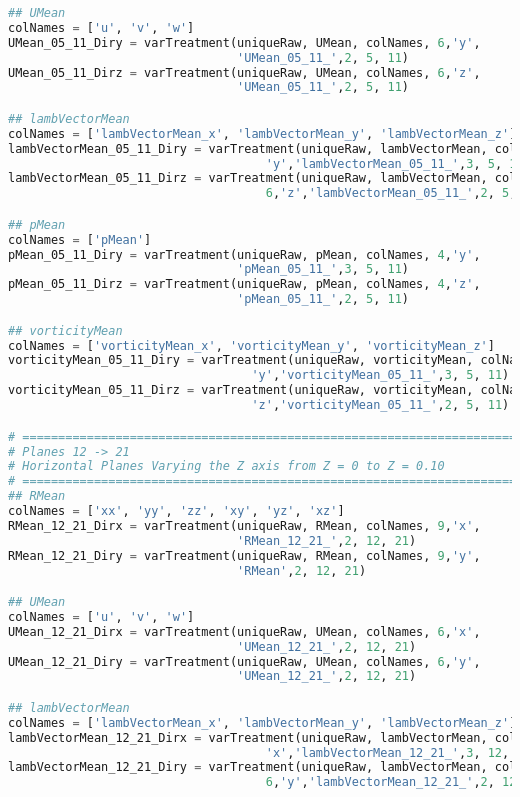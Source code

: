 \documentclass[../main.tex]{subfiles}
\begin{document}
\begin{lstlisting}[language=python]
## UMean
colNames = ['u', 'v', 'w']
UMean_05_11_Diry = varTreatment(uniqueRaw, UMean, colNames, 6,'y',
                                'UMean_05_11_',2, 5, 11)
UMean_05_11_Dirz = varTreatment(uniqueRaw, UMean, colNames, 6,'z',
                                'UMean_05_11_',2, 5, 11)

## lambVectorMean
colNames = ['lambVectorMean_x', 'lambVectorMean_y', 'lambVectorMean_z']
lambVectorMean_05_11_Diry = varTreatment(uniqueRaw, lambVectorMean, colNames, 6,
                                    'y','lambVectorMean_05_11_',3, 5, 11)
lambVectorMean_05_11_Dirz = varTreatment(uniqueRaw, lambVectorMean, colNames,
                                    6,'z','lambVectorMean_05_11_',2, 5, 11)

## pMean
colNames = ['pMean']
pMean_05_11_Diry = varTreatment(uniqueRaw, pMean, colNames, 4,'y',
                                'pMean_05_11_',3, 5, 11)
pMean_05_11_Dirz = varTreatment(uniqueRaw, pMean, colNames, 4,'z',
                                'pMean_05_11_',2, 5, 11)

## vorticityMean
colNames = ['vorticityMean_x', 'vorticityMean_y', 'vorticityMean_z']
vorticityMean_05_11_Diry = varTreatment(uniqueRaw, vorticityMean, colNames, 6,
                                  'y','vorticityMean_05_11_',3, 5, 11)
vorticityMean_05_11_Dirz = varTreatment(uniqueRaw, vorticityMean, colNames, 6,
                                  'z','vorticityMean_05_11_',2, 5, 11)

# =============================================================================
# Planes 12 -> 21
# Horizontal Planes Varying the Z axis from Z = 0 to Z = 0.10
# =============================================================================
## RMean
colNames = ['xx', 'yy', 'zz', 'xy', 'yz', 'xz']
RMean_12_21_Dirx = varTreatment(uniqueRaw, RMean, colNames, 9,'x',
                                'RMean_12_21_',2, 12, 21)
RMean_12_21_Diry = varTreatment(uniqueRaw, RMean, colNames, 9,'y',
                                'RMean',2, 12, 21)

## UMean
colNames = ['u', 'v', 'w']
UMean_12_21_Dirx = varTreatment(uniqueRaw, UMean, colNames, 6,'x',
                                'UMean_12_21_',2, 12, 21)
UMean_12_21_Diry = varTreatment(uniqueRaw, UMean, colNames, 6,'y',
                                'UMean_12_21_',2, 12, 21)

## lambVectorMean
colNames = ['lambVectorMean_x', 'lambVectorMean_y', 'lambVectorMean_z']
lambVectorMean_12_21_Dirx = varTreatment(uniqueRaw, lambVectorMean, colNames, 6,
                                    'x','lambVectorMean_12_21_',3, 12, 21)
lambVectorMean_12_21_Diry = varTreatment(uniqueRaw, lambVectorMean, colNames,
                                    6,'y','lambVectorMean_12_21_',2, 12, 21)


\end{lstlisting}
\end{document}
